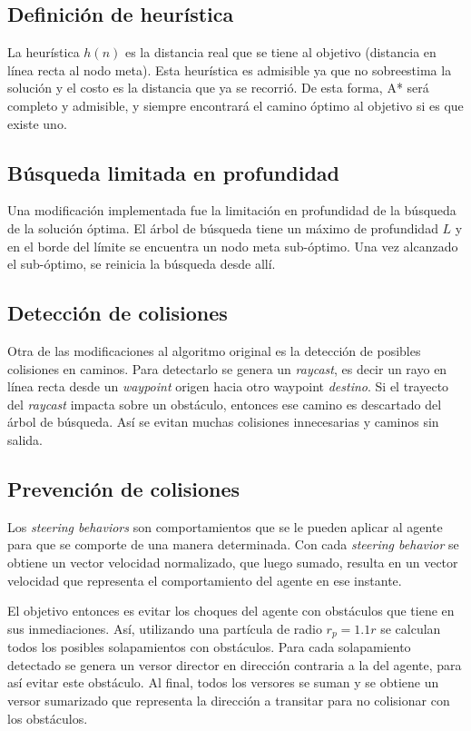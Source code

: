 \documentclass[a4paper,10pt]{article}
\begin{document}
\subsection{Definición de heurística}

La heurística $h(n)$ es la distancia real que se tiene al objetivo (distancia en línea recta al nodo meta). Esta heurística es admisible ya que no sobreestima la solución y el costo es la distancia que ya se recorrió. De esta forma, A* será completo y admisible, y siempre encontrará el camino óptimo al objetivo si es que existe uno.

\subsection{Búsqueda limitada en profundidad}

Una modificación implementada fue la limitación en profundidad de la búsqueda de la solución óptima. El árbol de búsqueda tiene un máximo de profundidad $L$ y en el borde del límite se encuentra un nodo meta sub-óptimo. Una vez alcanzado el sub-óptimo, se reinicia la búsqueda desde allí.

\subsection{Detección de colisiones}

Otra de las modificaciones al algoritmo original es la detección de posibles colisiones en caminos. Para detectarlo se genera un \textit{raycast}, es decir un rayo en línea recta desde un \textit{waypoint} origen hacia otro waypoint \textit{destino}. Si el trayecto del \textit{raycast} impacta sobre un obstáculo, entonces ese camino es descartado del árbol de búsqueda. Así se evitan muchas colisiones innecesarias y caminos sin salida.

\subsection{Prevención de colisiones}

Los \textit{steering behaviors} son comportamientos que se le pueden aplicar al agente para que se comporte de una manera determinada. Con cada \textit{steering behavior} se obtiene un vector velocidad normalizado, que luego sumado, resulta en un vector velocidad que representa el comportamiento del agente en ese instante.

El objetivo entonces es evitar los choques del agente con obstáculos que tiene en sus inmediaciones. Así, utilizando una partícula de radio $r_{p} = 1.1 r$ se calculan todos los posibles solapamientos con obstáculos. Para cada solapamiento detectado se genera un versor director en dirección contraria a la del agente, para así evitar este obstáculo. Al final, todos los versores se suman y se obtiene un versor sumarizado que representa la dirección a transitar para no colisionar con los obstáculos.
\end{document}
